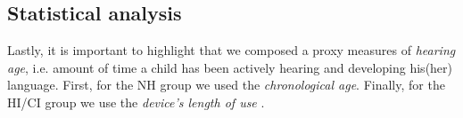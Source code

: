 \begin{comment}
158 Data collection and analysis were informed by preliminary work aimed at describing the causal and
159 non-causal factors inﬂuencing the association between age and knowledge. Speciﬁcally, we described
160 all the aspects of individuals that are expected to inﬂuence knowledge in a Direct Acyclic Graph
161 (DAG) and later in a full structural causal model that we used to validate the analysis code (see ﬁgure
162 3 and Supplementary section 9.5). A DAG is a heuristic generative model that allows derivation
163 of a causal estimand (Pearl, 1995). Each causal query may require a diﬀerent statistical procedure
164 that includes diﬀerent variables.
165 We relied on the DAG described above to plan data collection, so that all the variables would
166 be recorded, as well as to deﬁne the analyses described below. The analysis can be divided in a
167 descriptive and a causal section. The ﬁrst illustrates how knowledge changes with age; the causal
168 section, instead, describes the eﬀect of sex, activities, family and schooling on the development of
169 knowledge.
170 Of course it is possible that unobserved confounds exist along any edge in our DAG. We encourage
171 the perspective that any estimated eﬀects are possibly partially due to such confounding. This is true
172 in all observational, anthropological investigations. The additional transparency of our approach,
173 and its ability to logically derive statistical procedures from causal assumptions, is its strength.
\end{comment}
%
%
\subsection{Statistical analysis} 
%
Lastly, it is important to highlight that we composed a proxy measures of \textit{hearing age}, i.e. amount of time a child has been actively hearing and developing his(her) language. First, for the NH group we used the \textit{chronological age}. Finally, for the HI/CI group  we use the \textit{device's length of use} \citep{Faes_et_al_2021}.
%
\begin{comment}
	for the NH group uses the child's \textit{age} (at recording), the method cannot use the same variable for the other two groups. This is due to the fact that \textit{age} is merely used as a proxy, for the amount of time a child has been developing his(her) language. In that sense, more appropriate variables to use under the HI/CI group would be e.g. the \textit{device length of use}, which approximates the ``hearing age'' of such children, or their \textit{vocabulary size}, which resembles their "lexical age" \citep{Faes_et_al_2021}. For this research, we consider the \textit{device length of use} as the simplest one to implement. 
\end{comment}
%
%
